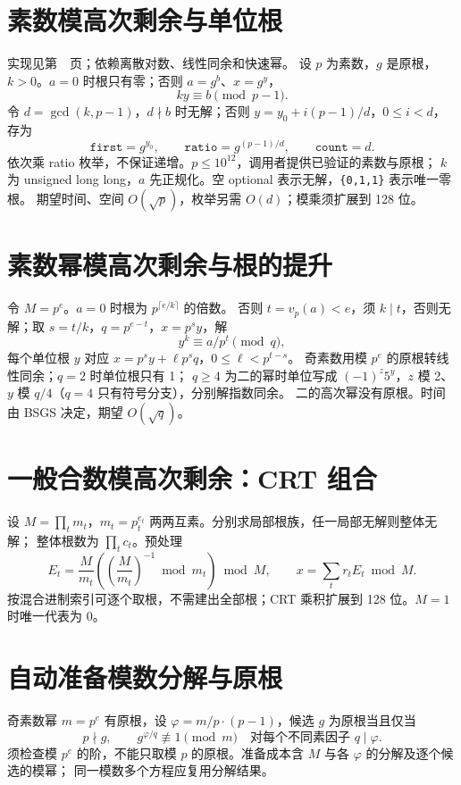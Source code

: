 \section{素数模高次剩余与单位根}\label{knowledge-higher-residue}
实现见第~\pageref{compact-KthResidue}~页；依赖离散对数、线性同余和快速幂。
设 $p$ 为素数，$g$ 是原根，$k>0$。$a=0$ 时根只有零；否则 $a=g^b$、$x=g^y$，
\[
ky\equiv b\pmod{p-1}.
\]
令 $d=\gcd(k,p-1)$，$d\nmid b$ 时无解；否则 $y=y_0+i(p-1)/d$，$0\le i<d$，存为
\[
\texttt{first}=g^{y_0},\qquad
\texttt{ratio}=g^{(p-1)/d},\qquad \texttt{count}=d.
\]
依次乘 ratio 枚举，不保证递增。$p\le10^{12}$，调用者提供已验证的素数与原根；
$k$ 为 unsigned long long，$a$ 先正规化。空 optional 表示无解，\texttt{\{0,1,1\}} 表示唯一零根。
期望时间、空间 $O(\sqrt p)$，枚举另需 $O(d)$；模乘须扩展到 128 位。

\section{素数幂模高次剩余与根的提升}\label{knowledge-prime-power-residue}
令 $M=p^e$。$a=0$ 时根为 $p^{\lceil e/k\rceil}$ 的倍数。
否则 $t=v_p(a)<e$，须 $k\mid t$，否则无解；取 $s=t/k$，$q=p^{e-t}$，$x=p^s y$，解
\[
y^k\equiv a/p^t\pmod q,
\]
每个单位根 $y$ 对应 $x=p^s y+\ell p^s q$，$0\le\ell<p^{t-s}$。
奇素数用模 $p^e$ 的原根转线性同余；$q=2$ 时单位根只有 1；
$q\ge4$ 为二的幂时单位写成 $(-1)^z5^y$，$z$ 模 2、$y$ 模 $q/4$（$q=4$ 只有符号分支），分别解指数同余。
二的高次幂没有原根。时间由 BSGS 决定，期望 $O(\sqrt q)$。

\section{一般合数模高次剩余：CRT 组合}\label{knowledge-composite-residue}
设 $M=\prod_t m_t$，$m_t=p_t^{e_t}$ 两两互素。分别求局部根族，任一局部无解则整体无解；
整体根数为 $\prod_t c_t$。预处理
\[
E_t=\frac M{m_t}\left(\left(\frac M{m_t}\right)^{-1}\bmod m_t\right)\bmod M,
\qquad x=\sum_t r_tE_t\bmod M.
\]
按混合进制索引可逐个取根，不需建出全部根；CRT 乘积扩展到 128 位。$M=1$ 时唯一代表为 0。

\section{自动准备模数分解与原根}\label{knowledge-residue-setup}
奇素数幂 $m=p^e$ 有原根，设 $\varphi=m/p\cdot(p-1)$，候选 $g$ 为原根当且仅当
\[
p\nmid g,\qquad g^{\varphi/q}\not\equiv1\pmod m
\quad\text{对每个不同素因子 }q\mid\varphi.
\]
须检查模 $p^e$ 的阶，不能只取模 $p$ 的原根。准备成本含 $M$ 与各 $\varphi$ 的分解及逐个候选的模幂；
同一模数多个方程应复用分解结果。
